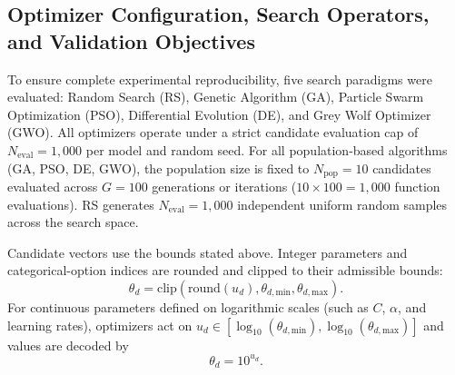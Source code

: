 \subsection{Optimizer Configuration, Search Operators, and Validation Objectives}
\label{sec:optimizerconfiguration}

To ensure complete experimental reproducibility, five search paradigms were evaluated: Random Search (RS), Genetic Algorithm (GA), Particle Swarm Optimization (PSO), Differential Evolution (DE), and Grey Wolf Optimizer (GWO). All optimizers operate under a strict candidate evaluation cap of $N_{\mathrm{eval}} = 1{,}000$ per model and random seed. For all population-based algorithms (GA, PSO, DE, GWO), the population size is fixed to $N_{\mathrm{pop}} = 10$ candidates evaluated across $G = 100$ generations or iterations ($10 \times 100 = 1{,}000$ function evaluations). RS generates $N_{\mathrm{eval}} = 1{,}000$ independent uniform random samples across the search space.

Candidate vectors use the bounds stated above. Integer parameters and categorical-option indices are rounded and clipped to their admissible bounds:
\begin{equation}\label{eq:decoding_discrete}
\theta_d = \mathrm{clip}\!\left(\mathrm{round}(u_d),\theta_{d,\mathrm{min}},\theta_{d,\mathrm{max}}\right).
\end{equation}
For continuous parameters defined on logarithmic scales (such as $C$, $\alpha$, and learning rates), optimizers act on $u_d\in[\log_{10}(\theta_{d,\mathrm{min}}),\log_{10}(\theta_{d,\mathrm{max}})]$ and values are decoded by
\begin{equation}\label{eq:decoding_log}
\theta_d = 10^{u_d}.
\end{equation}

